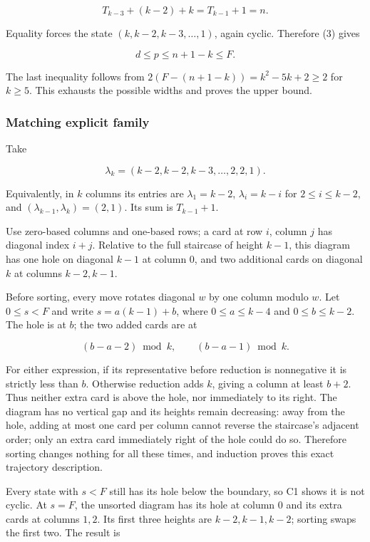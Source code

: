 \documentclass[11pt,a4paper]{article}
\begin{document}
\[
T_{k-3}+(k-2)+k=T_{k-1}+1=n.
\]

Equality forces the state \((k,k-2,k-3,\ldots,1)\), again cyclic. Therefore (3) gives

\[
d\le p\le n+1-k\le F.
\]

The last inequality follows from \(2(F-(n+1-k))=k^2-5k+2\ge2\) for \(k\ge5\). This exhausts the possible widths and proves the upper bound.

\subsubsection{Matching explicit family}\label{matching-explicit-family}

Take

\[
\lambda_k=(k-2,k-2,k-3,\ldots,2,2,1).
\]

Equivalently, in \(k\) columns its entries are \(\lambda_1=k-2\), \(\lambda_i=k-i\) for \(2\le i\le k-2\), and \((\lambda_{k-1},\lambda_k)=(2,1)\). Its sum is \(T_{k-1}+1\).

Use zero-based columns and one-based rows; a card at row \(i\), column \(j\) has diagonal index \(i+j\). Relative to the full staircase of height \(k-1\), this diagram has one hole on diagonal \(k-1\) at column \(0\), and two additional cards on diagonal \(k\) at columns \(k-2,k-1\).

Before sorting, every move rotates diagonal \(w\) by one column modulo \(w\). Let \(0\le s<F\) and write \(s=a(k-1)+b\), where \(0\le a\le k-4\) and \(0\le b\le k-2\). The hole is at \(b\); the two added cards are at

\[
(b-a-2)\bmod k,\qquad (b-a-1)\bmod k.
\]

For either expression, if its representative before reduction is nonnegative it is strictly less than \(b\). Otherwise reduction adds \(k\), giving a column at least \(b+2\). Thus neither extra card is above the hole, nor immediately to its right. The diagram has no vertical gap and its heights remain decreasing: away from the hole, adding at most one card per column cannot reverse the staircase's adjacent order; only an extra card immediately right of the hole could do so. Therefore sorting changes nothing for all these times, and induction proves this exact trajectory description.

Every state with \(s<F\) still has its hole below the boundary, so C1 shows it is not cyclic. At \(s=F\), the unsorted diagram has its hole at column \(0\) and its extra cards at columns \(1,2\). Its first three heights are \(k-2,k-1,k-2\); sorting swaps the first two. The result is
\end{document}
